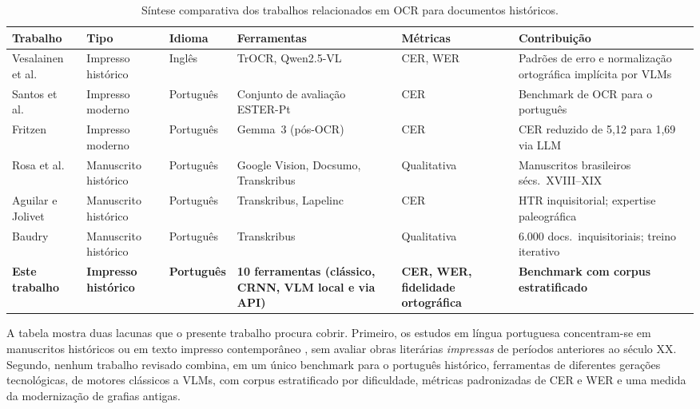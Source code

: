 \documentclass[noabntexcite,oneside]{ufsc-thesis-rn46-2019}
\begin{document}
\begin{table}[htb]
\centering
\caption{Síntese comparativa dos trabalhos relacionados em OCR para documentos
históricos.}
\label{tab:trabalhos_relacionados}
\renewcommand{\arraystretch}{1.4}
{\small
\begin{tabular}{L{2.4cm} L{2.0cm} L{1.7cm} L{2.6cm} L{1.9cm} L{2.8cm}}
\hline
\textbf{Trabalho} &
\textbf{Tipo} &
\textbf{Idioma} &
\textbf{Ferramentas} &
\textbf{Métricas} &
\textbf{Contribuição} \\
\hline
Vesalainen et al.\ \cite{vesalainen2025} &
  Impresso histórico & Inglês &
  TrOCR, Qwen2.5-VL & CER, WER &
  Padrões de erro e normalização ortográfica implícita por VLMs \\
\hline
Santos et al.\ \cite{santos2023} &
  Impresso moderno & Português &
  Conjunto de avaliação ESTER-Pt & CER &
  Benchmark de OCR para o português \\
\hline
Fritzen \cite{fritzen2025} &
  Impresso moderno & Português &
  Gemma~3 (pós-OCR) & CER &
  CER reduzido de 5,12 para 1,69 via LLM \\
\hline
Rosa et al.\ \cite{rosa2025} &
  Manuscrito histórico & Português &
  Google Vision, Docsumo, Transkribus & Qualitativa &
  Manuscritos brasileiros sécs.\ XVIII--XIX \\
\hline
Aguilar e Jolivet \cite{aguilar2024} &
  Manuscrito histórico & Português &
  Transkribus, Lapelinc & CER &
  HTR inquisitorial; expertise paleográfica \\
\hline
Baudry \cite{baudry2023} &
  Manuscrito histórico & Português &
  Transkribus & Qualitativa &
  6.000 docs.\ inquisitoriais; treino iterativo \\
\hline
\textbf{Este trabalho} &
  \textbf{Impresso histórico} & \textbf{Português} &
  \textbf{10 ferramentas (clássico, CRNN, VLM local e via API)} &
  \textbf{CER, WER, fidelidade ortográfica} &
  \textbf{Benchmark com corpus estratificado} \\
\hline
\end{tabular}
}
\end{table}

A tabela mostra duas lacunas que o presente trabalho procura cobrir. Primeiro,
os estudos em língua portuguesa concentram-se em manuscritos históricos
\cite{rosa2025,aguilar2024,baudry2023} ou em texto impresso contemporâneo
\cite{santos2023,fritzen2025}, sem avaliar obras literárias \textit{impressas}
de períodos anteriores ao século XX. Segundo, nenhum trabalho revisado combina, em um
único benchmark para o português histórico, ferramentas de diferentes gerações
tecnológicas, de motores clássicos a VLMs, com corpus estratificado por dificuldade,
métricas padronizadas de CER e WER e uma medida da modernização de grafias antigas.
\end{document}

